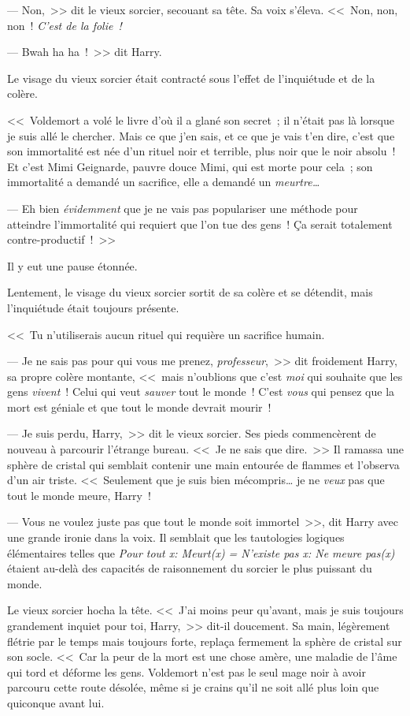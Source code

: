 --- Non,~>> dit le vieux sorcier, secouant sa tête. Sa voix s'éleva. <<~Non, non, non~! \emph{C'est de la folie~!}

--- Bwah ha ha~!~>> dit Harry.

Le visage du vieux sorcier était contracté sous l'effet de l'inquiétude et de la colère.

<<~Voldemort a volé le livre d'où il a glané son secret~; il n'était pas là lorsque je suis allé le chercher. Mais ce que j'en sais, et ce que je vais t'en dire, c'est que son immortalité est née d'un rituel noir et terrible, plus noir que le noir absolu~! Et c'est Mimi Geignarde, pauvre douce Mimi, qui est morte pour cela~; son immortalité a demandé un sacrifice, elle a demandé un \emph{meurtre…}

--- Eh bien \emph{évidemment} que je ne vais pas populariser une méthode pour atteindre l'immortalité qui requiert que l'on tue des gens~! Ça serait totalement contre-productif~!~>>

Il y eut une pause étonnée.

Lentement, le visage du vieux sorcier sortit de sa colère et se détendit, mais l'inquiétude était toujours présente.

<<~Tu n'utiliserais aucun rituel qui requière un sacrifice humain.

--- Je ne sais pas pour qui vous me prenez, \emph{professeur},~>> dit froidement Harry, sa propre colère montante, <<~mais n'oublions que c'est \emph{moi} qui souhaite que les gens \emph{vivent}~! Celui qui veut \emph{sauver} tout le monde~! C'est \emph{vous} qui pensez que la mort est géniale et que tout le monde devrait mourir~!

--- Je suis perdu, Harry,~>> dit le vieux sorcier. Ses pieds commencèrent de nouveau à parcourir l'étrange bureau. <<~Je ne sais que dire.~>> Il ramassa une sphère de cristal qui semblait contenir une main entourée de flammes et l'observa d'un air triste. <<~Seulement que je suis bien mécompris… je ne \emph{veux} pas que tout le monde meure, Harry~!

--- Vous ne voulez juste pas que tout le monde soit immortel~>>, dit Harry avec une grande ironie dans la voix. Il semblait que les tautologies logiques élémentaires telles que \emph{Pour tout x: Meurt(x) = N'existe pas x: Ne meure pas(x)} étaient au-delà des capacités de raisonnement du sorcier le plus puissant du monde.

Le vieux sorcier hocha la tête. <<~J'ai moins peur qu'avant, mais je suis toujours grandement inquiet pour toi, Harry,~>> dit-il doucement. Sa main, légèrement flétrie par le temps mais toujours forte, replaça fermement la sphère de cristal sur son socle. <<~Car la peur de la mort est une chose amère, une maladie de l'âme qui tord et déforme les gens. Voldemort n'est pas le seul mage noir à avoir parcouru cette route désolée, même si je crains qu'il ne soit allé plus loin que quiconque avant lui.

